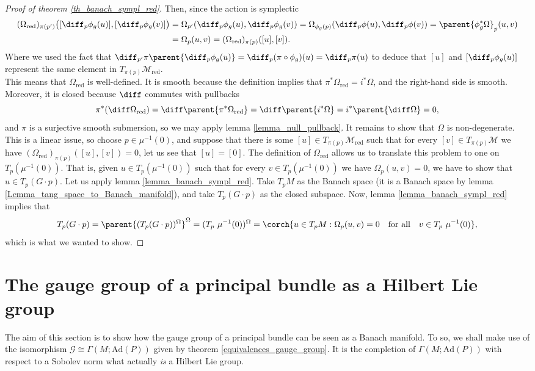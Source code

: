 \begin{proof}[\textit{Proof of theorem} \ref{th_banach_sympl_red}]
    Then, since the action is symplectic
    \begin{align*}
        (\Omega_{\mathrm{red}})_{\pi(p')}\big([\diff_p \phi_g(u)], [\diff_p \phi_g(v)]\big) & = \Omega_{p'}(\diff_p \phi_g(u),\diff_p\phi_g(v))=\Omega_{\phi_g(p)}(\diff_p \phi (u), \diff_p\phi(v))=\parent{\phi_g^*\Omega}_p(u,v) \\ 
        &= \Omega_p(u,v)  = (\Omega_{\mathrm{red}})_{\pi(p)}([u], [v]).
    \end{align*}
    Where we used the fact that \(\diff_{p'} \pi\parent{\diff_p\phi_g(u)}=\diff_p(\pi \circ \phi_g)(u)=\diff_p\pi(u)\) to deduce that \([u]\) and \([\diff_p\phi_g(u)]\) represent the same element in \(T_{\pi(p)}\mathcal{M}_{\mathrm{red}}\). \\
    
    This means that \(\Omega_{\mathrm{red}}\) is well-defined. It is smooth because the definition implies that \(\pi^*\Omega_{\mathrm{red}}=i^*\Omega\), and the right-hand side is smooth. Moreover, it is closed because \(\diff\) commutes with pullbacks
    \[
    \pi^*(\diff \Omega_{\mathrm{red}})=\diff\parent{\pi^*\Omega_\mathrm{red}}=\diff\parent{i^*\Omega}=i^*\parent{\diff \Omega}=0,
    \]
    and \(\pi\) is a surjective smooth submersion, so we may apply lemma \ref{lemma_null_pullback}. It remains to show that \(\Omega\) is non-degenerate. This is a linear issue, so choose \(p \in \mu^{-1}(0)\), and suppose that there is some \([u]\in T_{\pi(p)} \mathcal{M}_{\mathrm{red}}\) such that for every \([v]\in T_{\pi(p)}\mathcal{M}\) we have \((\Omega_{\mathrm{red}})_{\pi(p)}([u], [v])=0\), let us see that \([u]=[0]\). The definition of \(\Omega_{\mathrm{red}}\) allows us to translate this problem to one on \(T_p(\mu^{-1}(0))\). That is, given \(u \in T_p(\mu^{-1}(0))\) such that for every \(v \in T_p(\mu^{-1}(0))\) we have \(\Omega_p(u,v)=0\), we have to show that \(u \in T_p(G \cdot p)\). Let us apply lemma \ref{lemma_banach_sympl_red}. Take \(T_pM\) as the Banach space (it is a Banach space by lemma \ref{Lemma_tang_space_to_Banach_manifold}), and take \(T_p(G \cdot p)\) as the closed subspace. Now, lemma \ref{lemma_banach_sympl_red} implies that 
    \[
    T_p(G\cdot p)=\parent{(T_p(G \cdot p))^\Omega}^\Omega=(T_p \ \mu^{-1}(0))^\Omega=\corch{u \in T_pM: \Omega_p(u,v)=0 \ \ \text{ for all }\ \ v \in T_p \ \mu^{-1}(0)},
    \]
    which is what we wanted to show.
\end{proof}
\section{The gauge group of a principal bundle as a Hilbert Lie group} \label{section_gauge_group_is_Hilbert}
The aim of this section is to show how the gauge group of a principal bundle can be seen as a Banach manifold. To so, we shall make use of the isomorphism \(\mathscr{G}\cong \Gamma(M; \mathrm{Ad}(P))\) given by theorem \ref{equivalences_gauge_group}. It is the completion of \(\Gamma(M; \mathrm{Ad}(P))\) with respect to a Sobolev norm what actually \textit{is} a Hilbert Lie group.
